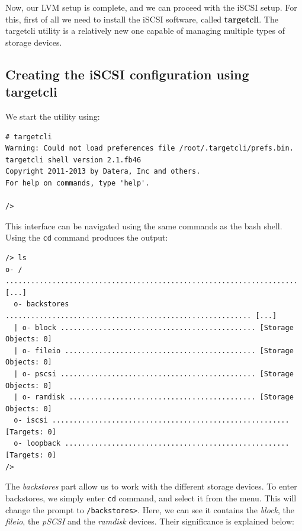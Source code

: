 \noindent
Now, our LVM setup is complete, and we can proceed with the iSCSI setup. For this, first of all we need to install the iSCSI software, called \textbf{targetcli}. The targetcli utility is a relatively new one capable of managing multiple types of storage devices. 

\subsection{Creating the iSCSI configuration using targetcli}
We start the utility using:

\vspace{-15pt}
\begin{verbatim}
# targetcli
Warning: Could not load preferences file /root/.targetcli/prefs.bin.
targetcli shell version 2.1.fb46
Copyright 2011-2013 by Datera, Inc and others.
For help on commands, type 'help'.

/> 
\end{verbatim}
\vspace{-10pt}

\noindent
This interface can be navigated using the same commands as the bash shell. Using the \verb|cd| command produces the output:

\vspace{-15pt}
\begin{verbatim}
/> ls
o- / ..................................................................... [...]
  o- backstores .......................................................... [...]
  | o- block .............................................. [Storage Objects: 0]
  | o- fileio ............................................. [Storage Objects: 0]
  | o- pscsi .............................................. [Storage Objects: 0]
  | o- ramdisk ............................................ [Storage Objects: 0]
  o- iscsi ........................................................ [Targets: 0]
  o- loopback ..................................................... [Targets: 0]
/> 
\end{verbatim}
\vspace{-10pt}

\noindent
The \textit{backstores} part allow us to work with the different storage devices. To enter backstores, we simply enter \verb|cd| command, and select it from the menu. This will change the prompt to \verb|/backstores>|. Here, we can see it contains the \textit{block}, the \textit{fileio}, the \textit{pSCSI} and the \textit{ramdisk} devices. Their significance is explained below:


